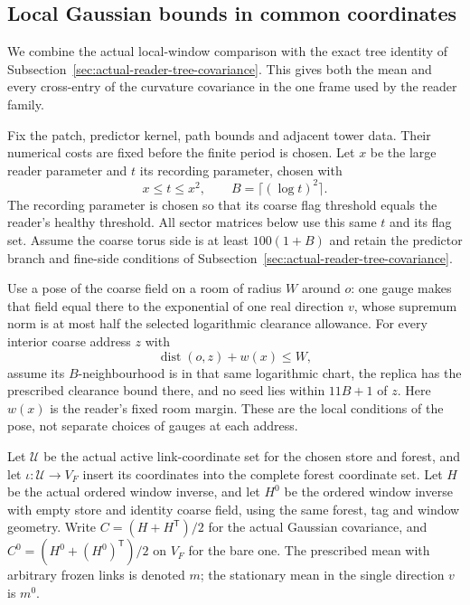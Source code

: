 \subsection{Local Gaussian bounds in common coordinates}
\label{sec:actual-reader-local-gaussian-prices}

We combine the actual local-window comparison with the exact tree
identity of Subsection~\ref{sec:actual-reader-tree-covariance}. This
gives both the mean and every cross-entry of the curvature covariance
in the one frame used by the reader family.

Fix the patch, predictor kernel, path bounds and adjacent tower data.
Their numerical costs are fixed before the finite period is chosen.
Let $x$ be the large reader parameter and $t$ its recording parameter,
chosen with
\[
 x\le t\le x^2,\qquad B=\lceil(\log t)^2\rceil.
\]
The recording parameter is chosen so that its coarse flag threshold
equals the reader's healthy threshold. All sector matrices below use
this same $t$ and its flag set. Assume the coarse torus side is at least
$100(1+B)$ and retain the predictor branch and fine-side conditions
of Subsection~\ref{sec:actual-reader-tree-covariance}.

Use a pose of the coarse field on a room of radius $W$ around $o$:
one gauge makes that field equal there to the exponential of one
real direction $v$, whose supremum norm is at most half the
selected logarithmic clearance allowance. For every interior coarse
address $z$ with
\[
 \operatorname{dist}(o,z)+w(x)\le W,
\]
assume its $B$-neighbourhood is in that same logarithmic chart,
the replica has the prescribed clearance bound there, and no seed
lies within $11B+1$ of $z$. Here $w(x)$ is the reader's fixed room
margin. These are the local conditions of the pose, not separate
choices of gauges at each address.

Let $\mathcal U$ be the actual active link-coordinate set for the
chosen store and forest, and let
$\iota:\mathcal U\to V_F$ insert its coordinates into the complete
forest coordinate set. Let $H$ be the actual ordered window inverse,
and let $H^0$ be the ordered window inverse with empty store and
identity coarse field, using the same forest, tag and window geometry.
Write $C=(H+H^{\mathsf T})/2$ for the actual Gaussian covariance,
and $C^0=(H^0+(H^0)^{\mathsf T})/2$ on $V_F$ for the bare one.
The prescribed mean with arbitrary frozen links is denoted $m$;
the stationary mean in the single direction $v$ is $m^0$.

